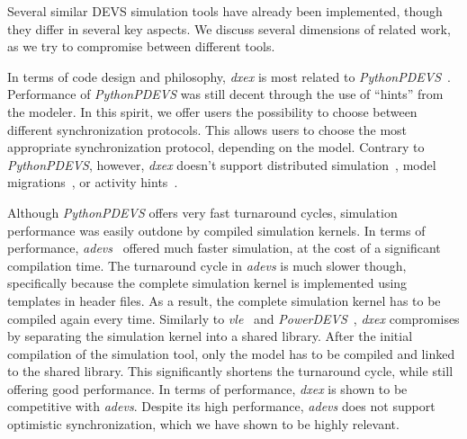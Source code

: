 Several similar \textsf{DEVS} simulation tools have already been implemented, though they differ in several key aspects.
We discuss several dimensions of related work, as we try to compromise between different tools.

In terms of code design and philosophy, \textit{dxex} is most related to \textit{PythonPDEVS}~\cite{PythonPDEVS}.
Performance of \textit{PythonPDEVS} was still decent through the use of ``hints'' from the modeler.
In this spirit, we offer users the possibility to choose between different synchronization protocols.
This allows users to choose the most appropriate synchronization protocol, depending on the model.
Contrary to \textit{PythonPDEVS}, however, \textit{dxex} doesn't support distributed simulation~\cite{JDF}, model migrations~\cite{PythonPDEVS2}, or activity hints~\cite{PythonPDEVS_ACTIMS}.

Although \textit{PythonPDEVS} offers very fast turnaround cycles, simulation performance was easily outdone by compiled simulation kernels.
In terms of performance, \textit{adevs}~\cite{adevs} offered much faster simulation, at the cost of a significant compilation time.
The turnaround cycle in \textit{adevs} is much slower though, specifically because the complete simulation kernel is implemented using templates in header files.
As a result, the complete simulation kernel has to be compiled again every time.
Similarly to \textit{vle}~\cite{vle} and \textit{PowerDEVS}~\cite{PowerDEVS}, \textit{dxex} compromises by separating the simulation kernel into a shared library.
After the initial compilation of the simulation tool, only the model has to be compiled and linked to the shared library.
This significantly shortens the turnaround cycle, while still offering good performance.
In terms of performance, \textit{dxex} is shown to be competitive with \textit{adevs}.
Despite its high performance, \textit{adevs} does not support optimistic synchronization, which we have shown to be highly relevant.

